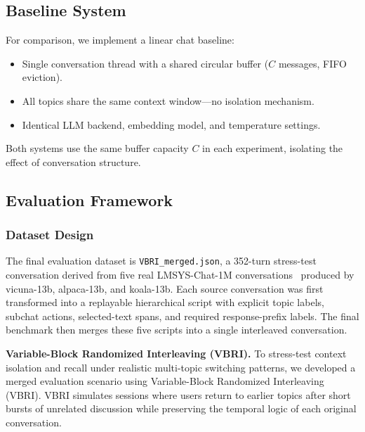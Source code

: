 \documentclass[pdflatex,sn-mathphys-num]{sn-jnl}%
\theoremstyle{thmstyleone}%
\theoremstyle{thmstyletwo}%
\theoremstyle{thmstylethree}%
\begin{document}
\subsection{Baseline System}\label{subsec:baseline}

For comparison, we implement a linear chat baseline:
\begin{itemize}
    \item Single conversation thread with a shared circular buffer ($C$ messages, FIFO eviction).
    \item All topics share the same context window---no isolation mechanism.
    \item Identical LLM backend, embedding model, and temperature settings.
\end{itemize}
Both systems use the same buffer capacity $C$ in each experiment, isolating the effect of conversation structure.

\subsection{Evaluation Framework}\label{subsec:eval}

\subsubsection{Dataset Design}\label{subsubsec:dataset}

The final evaluation dataset is \texttt{VBRI\_merged.json}, a 352-turn stress-test conversation derived from five real LMSYS-Chat-1M conversations~\cite{zheng2024lmsyschat} produced by vicuna-13b, alpaca-13b, and koala-13b. Each source conversation was first transformed into a replayable hierarchical script with explicit topic labels, subchat actions, selected-text spans, and required response-prefix labels. The final benchmark then merges these five scripts into a single interleaved conversation.

\textbf{Variable-Block Randomized Interleaving (VBRI).}
To stress-test context isolation and recall under realistic multi-topic switching patterns, we developed a merged evaluation scenario using Variable-Block Randomized Interleaving (VBRI). VBRI simulates sessions where users return to earlier topics after short bursts of unrelated discussion while preserving the temporal logic of each original conversation.
\end{document}
